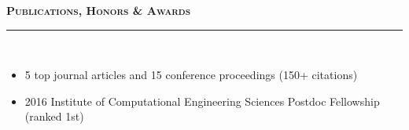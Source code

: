 \documentclass[11pt]{article}
\newcommand{\sep}{\ding{118}\;}
\begin{document}
\textbf{\textsc{\LARGE{Publications, Honors \& Awards}}} \\ \rule[0.8em]{\textwidth}{0.5pt} \\[-18pt]

\begin{itemize}[topsep=0pt,partopsep=0pt,leftmargin=16pt]
\item 5 top journal articles and 15 conference proceedings (150+ citations) 
\item 2016 Institute of Computational Engineering Sciences Postdoc Fellowship (ranked 1st)
\end{itemize}

\vspace{2pt}
%


\end{document}
